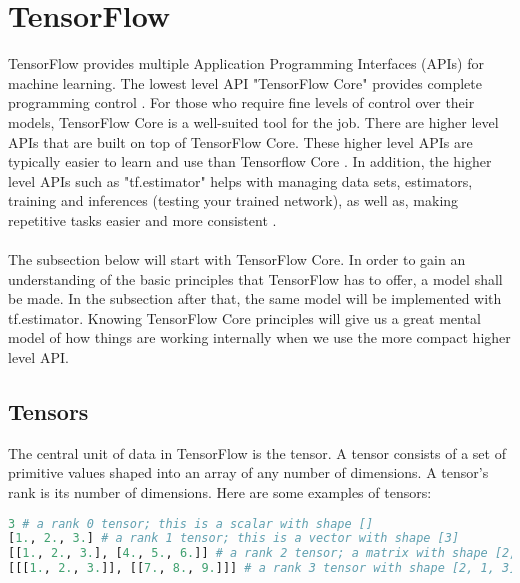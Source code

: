 \section{TensorFlow}
TensorFlow provides multiple Application Programming Interfaces
(APIs) for machine learning. 
The lowest level API "TensorFlow Core" provides complete programming control \cite{tensorflow2015-whitepaper}. 
For those who require fine levels of control over their models,
TensorFlow Core is a well-suited tool for the job. There are higher level APIs that are built on top of TensorFlow Core.
These higher level APIs are typically easier to learn and use than Tensorflow Core \cite{tensorflow2015-whitepaper}.
In addition, the higher level APIs such as "tf.estimator" helps with managing data sets, estimators,
training and inferences (testing your trained network),
as well as, making repetitive tasks easier and more consistent
\cite{tensorflow2015-whitepaper}.\\\\
The subsection below will start with TensorFlow Core. 
In order to gain an understanding of the basic principles that TensorFlow has to offer, a model shall be made. 
In the subsection after that, the same model will be implemented with tf.estimator. 
Knowing TensorFlow Core principles will give us a great mental model of how things are working internally when we use the more compact higher level API.

\subsection{Tensors}
The central unit of data in TensorFlow is the tensor. 
A tensor consists of a set of primitive values shaped into an array of any number of dimensions. 
A tensor's rank is its number of dimensions. 
Here are some examples of tensors:
\begin{lstlisting}[language=Python, caption=Tensor examples.]
3 # a rank 0 tensor; this is a scalar with shape []
[1., 2., 3.] # a rank 1 tensor; this is a vector with shape [3]
[[1., 2., 3.], [4., 5., 6.]] # a rank 2 tensor; a matrix with shape [2, 3]
[[[1., 2., 3.]], [[7., 8., 9.]]] # a rank 3 tensor with shape [2, 1, 3]
\end{lstlisting} 

